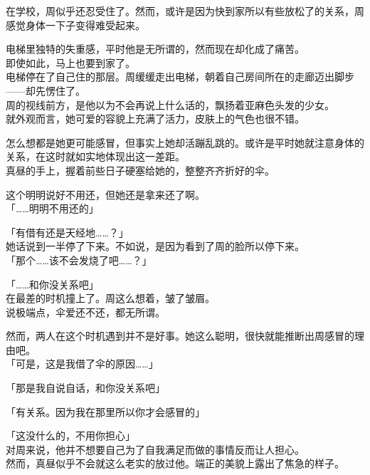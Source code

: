 在学校，周似乎还忍受住了。然而，或许是因为快到家所以有些放松了的关系，周感觉身体一下子变得难受起来。

电梯里独特的失重感，平时他是无所谓的，然而现在却化成了痛苦。\\

即使如此，马上也要到家了。\\

电梯停在了自己住的那层。周缓缓走出电梯，朝着自己房间所在的走廊迈出脚步——却先愣住了。\\

周的视线前方，是他以为不会再说上什么话的，飘扬着亚麻色头发的少女。\\

就外观而言，她可爱的容貌上充满了活力，皮肤上的气色也很不错。

怎么想都是她更可能感冒，但事实上她却活蹦乱跳的。或许是平时她就注意身体的关系，在这时就如实地体现出这一差距。\\

真昼的手上，握着前些日子硬塞给她的，整整齐齐折好的伞。

这个明明说好不用还，但她还是拿来还了啊。\\

「……明明不用还的」

「有借有还是天经地……？」\\

她话说到一半停了下来。不如说，是因为看到了周的脸所以停下来。\\

「那个……该不会发烧了吧……？」

「……和你没关系吧」\\

在最差的时机撞上了。周这么想着，皱了皱眉。\\

说极端点，伞爱还不还，都无所谓。

然而，两人在这个时机遇到并不是好事。她这么聪明，很快就能推断出周感冒的理由吧。\\

「可是，这是我借了伞的原因……」

「那是我自说自话，和你没关系吧」

「有关系。因为我在那里所以你才会感冒的」

「这没什么的，不用你担心」\\

对周来说，他并不想要自己为了自我满足而做的事情反而让人担心。\\

然而，真昼似乎不会就这么老实的放过他。端正的美貌上露出了焦急的样子。\\

